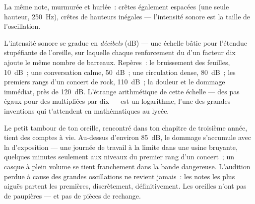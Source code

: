 \begin{omfigure}

{\small La même note, murmurée et hurlée~: crêtes également espacées
(une seule hauteur, \qty{250}{Hz}), crêtes de hauteurs inégales ---
l'intensité sonore est la taille de l'oscillation.}
\end{omfigure}

\begin{example}\label{ex:g8:sound-pitch-loudness:decibels}
L'intensité sonore se gradue en \emph{décibels}
(\unit{dB}) --- une échelle bâtie pour l'étendue stupéfiante de
l'oreille, sur laquelle chaque renforcement du  d'un facteur dix
ajoute le même nombre de barreaux. Repères~: le bruissement des
feuilles, \qty{10}{dB}~; une conversation calme, \qty{50}{dB}~; une
circulation dense, \qty{80}{dB}~; les premiers rangs d'un concert de
rock, \qty{110}{dB}~; la douleur et le dommage immédiat, près de
\qty{120}{dB}. L'étrange arithmétique de cette échelle --- des pas
égaux pour des  multipliées par dix --- est un logarithme, l'une
des grandes inventions qui t'attendent en mathématiques au lycée.
\end{example}

\begin{remark}\label{rem:g8:sound-pitch-loudness:earsafety}
Le petit tambour de ton oreille, rencontré dans ton chapitre de
troisième année, tient des comptes à vie. Au-dessus d'environ
\qty{85}{dB}, le dommage s'accumule avec la  d'exposition ---
une journée de travail à la limite dans une usine bruyante, quelques
minutes seulement aux niveaux du premier rang d'un concert~; un casque
à plein volume se tient franchement dans la bande dangereuse.
L'audition perdue à cause des grandes oscillations ne revient jamais~:
les notes les plus aiguës partent les premières, discrètement,
définitivement. Les oreilles n'ont pas de paupières --- et pas de
pièces de rechange.
\end{remark}

